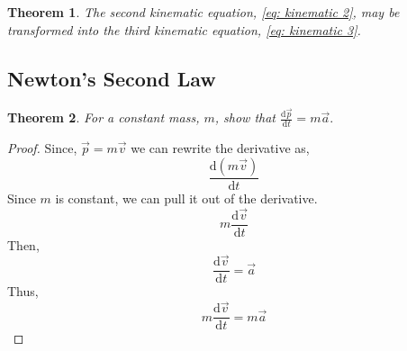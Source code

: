 \documentclass{article}
\newtheorem{theorem}{Theorem}[section]
\begin{document}
\begin{theorem}
    The second kinematic equation, \ref{eq: kinematic 2}, may be transformed into the third kinematic equation, \ref{eq: kinematic 3}.
\end{theorem}

\subsection{Newton's Second Law}
\begin{theorem}
For a constant mass, $m$, show that $\frac{\mathrm{d}\vec{p}}{\mathrm{d}t} = m\vec{a}.$
\end{theorem}
\begin{proof}
    Since, $\vec{p} = m \vec{v}$ we can rewrite the derivative as,
    \[ \frac{\mathrm{d}(m \vec{v})}{\mathrm{d}t} \]
    Since $m$ is constant, we can pull it out of the derivative.
    \[ m\frac{\mathrm{d}\vec{v}}{\mathrm{d}t} \]
    Then,
    \[\frac{\mathrm{d}\vec{v}}{\mathrm{d}t} = \vec{a}\]
    Thus, \[ m\frac{\mathrm{d}\vec{v}}{\mathrm{d}t} = m\vec{a}\]
\end{proof}
\end{document}
